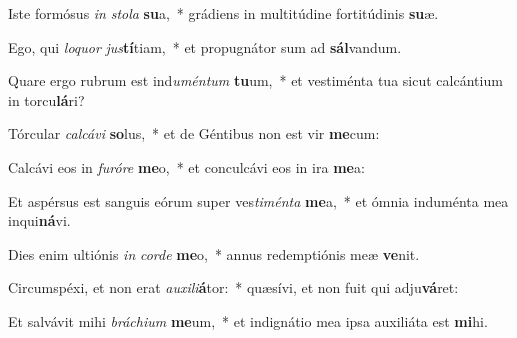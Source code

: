 \item Iste formósus \textit{in} \textit{sto}\textit{la} \textbf{su}a,~* grádiens in multitúdine fortitúdinis \textbf{su}æ.
\item Ego, qui \textit{lo}\textit{quor} \textit{jus}\textbf{tí}tiam,~* et propugnátor sum ad \textbf{sál}vandum.
\item Quare ergo rubrum est ind\textit{u}\textit{mén}\textit{tum} \textbf{tu}um,~* et vestiménta tua sicut calcántium in torcu\textbf{lá}ri?
\item Tórcular \textit{cal}\textit{cá}\textit{vi} \textbf{so}lus,~* et de Géntibus non est vir \textbf{me}cum:
\item Calcávi eos in \textit{fu}\textit{ró}\textit{re} \textbf{me}o,~* et conculcávi eos in ira \textbf{me}a:
\item Et aspérsus est sanguis eórum super ves\textit{ti}\textit{mén}\textit{ta} \textbf{me}a,~* et ómnia induménta mea inqui\textbf{ná}vi.
\item Dies enim ultiónis \textit{in} \textit{cor}\textit{de} \textbf{me}o,~* annus redemptiónis meæ \textbf{ve}nit.
\item Circumspéxi, et non erat \textit{au}\textit{xi}\textit{li}\textbf{á}tor:~* quæsívi, et non fuit qui adju\textbf{vá}ret:
\item Et salvávit mihi \textit{brá}\textit{chi}\textit{um} \textbf{me}um,~* et indignátio mea ipsa auxiliáta est \textbf{mi}hi.
